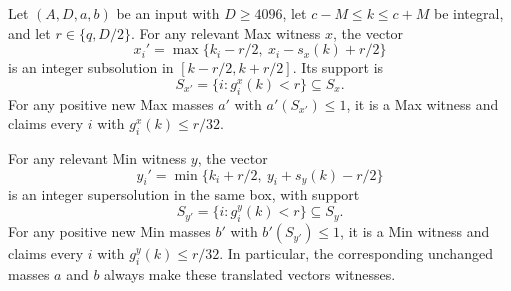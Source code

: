 \begin{lemma}
\label{lem:translation}
Let $(A,D,a,b)$ be an input with $D\ge4096$, let
$c-M\le k\le c+M$ be integral, and let $r\in\{q,D/2\}$.
For any relevant Max witness $x$, the vector
\begin{equation}
 x_i'=\max\{k_i-r/2,\ x_i-s_x(k)+r/2\}
 \label{eq:max-translation}
\end{equation}
is an integer subsolution in $[k-r/2,k+r/2]$. Its support is
\[
                  S_{x'}=\{i:g_i^x(k)<r\}\subseteq S_x.
\]
For any positive new Max masses $a'$ with $a'(S_{x'})\le1$,
it is a Max witness and claims every $i$ with $g_i^x(k)\le r/32$.

For any relevant Min witness $y$, the vector
\begin{equation}
 y_i'=\min\{k_i+r/2,\ y_i+s_y(k)-r/2\}
 \label{eq:min-translation}
\end{equation}
is an integer supersolution in the same box, with support
\[
                  S_{y'}=\{i:g_i^y(k)<r\}\subseteq S_y.
\]
For any positive new Min masses $b'$ with $b'(S_{y'})\le1$,
it is a Min witness and claims every $i$ with $g_i^y(k)\le r/32$.
In particular, the corresponding unchanged masses $a$ and $b$ always
make these translated vectors witnesses.
\end{lemma}

